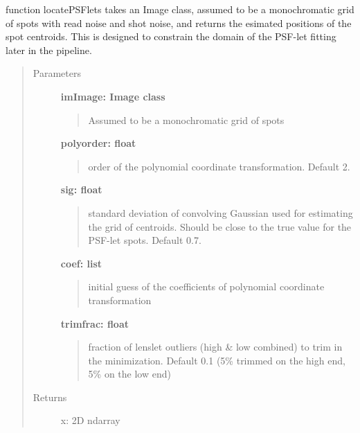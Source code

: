 \documentclass[letterpaper,10pt,english]{sphinxmanual}
\begin{document}

\begin{fulllineitems}
\label{tools:tools.locate_psflets.locatePSFlets}
function locatePSFlets takes an Image class, assumed to be a
monochromatic grid of spots with read noise and shot noise, and
returns the esimated positions of the spot centroids.  This is
designed to constrain the domain of the PSF-let fitting later in
the pipeline.
\begin{quote}\begin{description}
\item[{Parameters}] \leavevmode
\textbf{imImage: Image class}
\begin{quote}

Assumed to be a monochromatic grid of spots
\end{quote}

\textbf{polyorder: float}
\begin{quote}

order of the polynomial coordinate transformation. Default 2.
\end{quote}

\textbf{sig: float}
\begin{quote}

standard deviation of convolving Gaussian used
for estimating the grid of centroids.  Should be close
to the true value for the PSF-let spots.  Default 0.7.
\end{quote}

\textbf{coef: list}
\begin{quote}

initial guess of the coefficients of polynomial
coordinate transformation
\end{quote}

\textbf{trimfrac: float}
\begin{quote}

fraction of lenslet outliers (high \& low
combined) to trim in the minimization.  Default 0.1
(5\% trimmed on the high end, 5\% on the low end)
\end{quote}

\item[{Returns}] \leavevmode
x: 2D ndarray
\begin{quote}


\end{quote}
\end{description}
\end{quote}
\end{fulllineitems}
\end{document}
